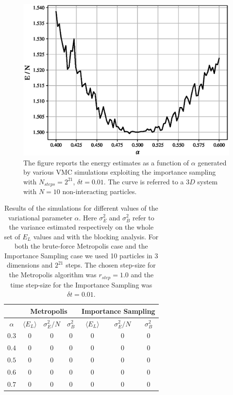 \begin{figure}[H]
    \includegraphics[scale=0.5]{images/varying_alpha_noninteract.eps}
    \caption{The figure reports the energy estimates as a function of $\alpha$ generated by various VMC simulations exploiting the importance sampling with $N_{steps}=2^{21}$, $\delta t = 0.01$. The curve is referred to a $3D$ system with $N=10$ non-interacting particles.}
    \label{fig:varying_alpha_noninteract_importance}
\end{figure}


\begin{table}[H]
    \centering
    \begin{tabular}{c|ccc|ccc}
         & \multicolumn{3}{c|}{Metropolis} & \multicolumn{3}{c}{Importance Sampling} \\
        \midrule
         $\alpha$ & $\langle E_L \rangle$ & $\sigma^2_E/N$ & $\sigma^2_B$ & $\langle E_L \rangle$ & $\sigma^2_E/N$ & $\sigma^2_B$ \\
         \midrule
         $0.3$ & $0$ & $0$ & $0$ & $0$  & $0$ & $0$ \\
         $0.4$ & $0$ & $0$ & $0$ & $0$  & $0$ & $0$ \\
         $0.5$ & $0$ & $0$ & $0$ & $0$  & $0$ & $0$ \\
         $0.6$ & $0$ & $0$ & $0$ & $0$  & $0$ & $0$ \\
         $0.7$ & $0$ & $0$ & $0$ & $0$  & $0$ & $0$ \\
         \bottomrule
    \end{tabular}
    \caption{Results of the simulations for different values of the variational parameter $\alpha$. Here $\sigma_E^2$ and $\sigma_B^2$ refer to the variance estimated respectively on the whole set of $E_L$ values and with the blocking analysis. For both the brute-force Metropolis case and the Importance Sampling case we used 10 particles in 3 dimensions and $2^{21}$ steps. The chosen step-size for the Metropolis algorithm was $r_{step}=1.0$ and the time step-size for the Importance Sampling was $\delta t = 0.01$. }
    \label{tab:varying_alpha_noninteracting}
\end{table}


